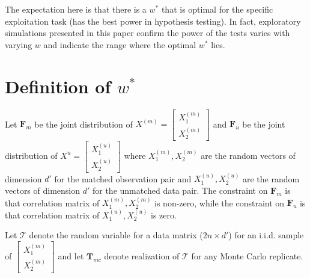 \documentclass[11pt]{article} %
\begin{document}
The expectation here is that there is a $w^*$ that is optimal for the specific exploitation task (has the best power in hypothesis testing). In fact,  exploratory simulations presented in this paper confirm the power of the tests varies with varying $w$ and indicate the range where the optimal  $w^*$ lies.



\section{Definition of  $w^{*}$}

Let $\mathbf{F}_m$ be the joint distribution of
$X^{(m)}= \left[
 \begin{array}{c}
X_{1}^{(m)}\\
X_{2}^{(m)}
\end{array}
\right]$ and 
$\mathbf{F}_u$ be the  joint distribution of
$X^{u}= \left[
 \begin{array}{c}
 X_{1}^{(u)}\\
 X_{2}^{(u)} 
\end{array}
\right]$
 where   $X_{1}^{(m)},X_{2}^{(m)}$ are the random vectors of dimension $d'$ for the matched observation pair and $X_{1}^{(u)},X_{2}^{(u)}$ are the random vectors of dimension $d'$ for the unmatched data pair.   The constraint on  $\mathbf{F}_m$ is that  correlation  matrix of $X_{1}^{(m)},X_{2}^{(m)}$ is non-zero, while  the constraint on $\mathbf{F}_u$   is that correlation  matrix of $X_{1}^{(u)},X_{2}^{(u)}$ is zero. 
 

Let $\mathcal{T}$ denote  the random variable for a data matrix ($2n\times d'$) for an  i.i.d. sample of  
$\left[ \begin{array}{c}
X_{1}^{(m)}\\
X_{2}^{(m)}
\end{array}
\right]$ and let  $\mathbf{T}_{mc}$  denote realization of $\mathcal{T}$ for any Monte Carlo replicate.
\end{document}
